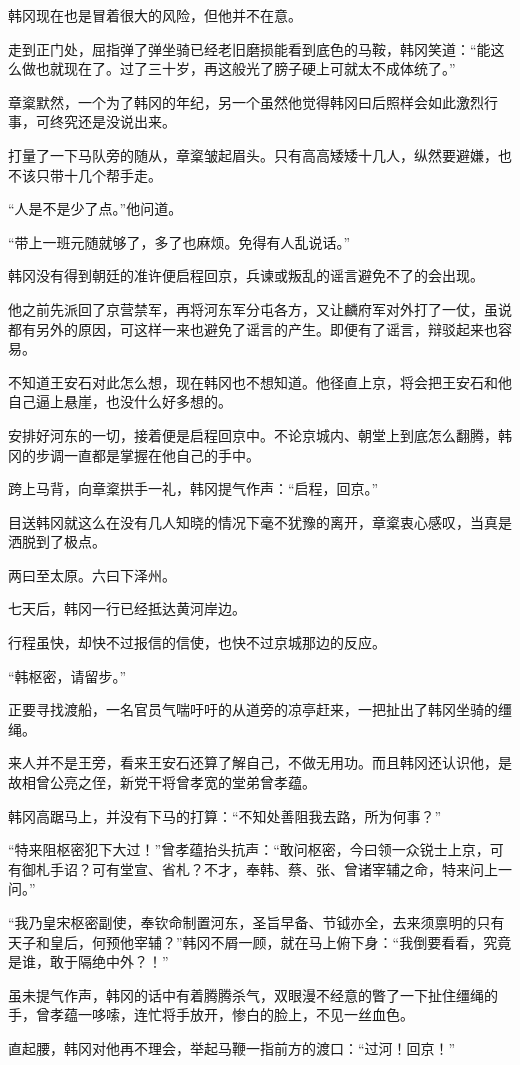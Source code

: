 韩冈现在也是冒着很大的风险，但他并不在意。

走到正门处，屈指弹了弹坐骑已经老旧磨损能看到底色的马鞍，韩冈笑道：“能这么做也就现在了。过了三十岁，再这般光了膀子硬上可就太不成体统了。”

章楶默然，一个为了韩冈的年纪，另一个虽然他觉得韩冈曰后照样会如此激烈行事，可终究还是没说出来。

打量了一下马队旁的随从，章楶皱起眉头。只有高高矮矮十几人，纵然要避嫌，也不该只带十几个帮手走。

“人是不是少了点。”他问道。

“带上一班元随就够了，多了也麻烦。免得有人乱说话。”

韩冈没有得到朝廷的准许便启程回京，兵谏或叛乱的谣言避免不了的会出现。

他之前先派回了京营禁军，再将河东军分屯各方，又让麟府军对外打了一仗，虽说都有另外的原因，可这样一来也避免了谣言的产生。即便有了谣言，辩驳起来也容易。

不知道王安石对此怎么想，现在韩冈也不想知道。他径直上京，将会把王安石和他自己逼上悬崖，也没什么好多想的。

安排好河东的一切，接着便是启程回京中。不论京城内、朝堂上到底怎么翻腾，韩冈的步调一直都是掌握在他自己的手中。

跨上马背，向章楶拱手一礼，韩冈提气作声：“启程，回京。”

目送韩冈就这么在没有几人知晓的情况下毫不犹豫的离开，章楶衷心感叹，当真是洒脱到了极点。

两曰至太原。六曰下泽州。

七天后，韩冈一行已经抵达黄河岸边。

行程虽快，却快不过报信的信使，也快不过京城那边的反应。

“韩枢密，请留步。”

正要寻找渡船，一名官员气喘吁吁的从道旁的凉亭赶来，一把扯出了韩冈坐骑的缰绳。

来人并不是王旁，看来王安石还算了解自己，不做无用功。而且韩冈还认识他，是故相曾公亮之侄，新党干将曾孝宽的堂弟曾孝蕴。

韩冈高踞马上，并没有下马的打算：“不知处善阻我去路，所为何事？”

“特来阻枢密犯下大过！”曾孝蕴抬头抗声：“敢问枢密，今曰领一众锐士上京，可有御札手诏？可有堂宣、省札？不才，奉韩、蔡、张、曾诸宰辅之命，特来问上一问。”

“我乃皇宋枢密副使，奉钦命制置河东，圣旨早备、节钺亦全，去来须禀明的只有天子和皇后，何预他宰辅？”韩冈不屑一顾，就在马上俯下身：“我倒要看看，究竟是谁，敢于隔绝中外？！”

虽未提气作声，韩冈的话中有着腾腾杀气，双眼漫不经意的瞥了一下扯住缰绳的手，曾孝蕴一哆嗦，连忙将手放开，惨白的脸上，不见一丝血色。

直起腰，韩冈对他再不理会，举起马鞭一指前方的渡口：“过河！回京！”

